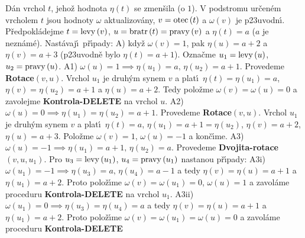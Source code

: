 \flushpar D\'an vrchol $t$, jeho\v z hodnota $\eta \left(t\right)$ se zmen\v sila (o $
1$).  V 
podstromu ur\v cen\'em vrcholem $t$ jsou hodnoty $\omega$ aktualizov\'any, 
$v=\operatorname{otec}\left(t\right)$ a $\omega \left(v\right)$ je p\accent23uvodn\'\i .  P\v redpokl\'adejme 
$t=\operatorname{levy}\left(v\right)$, $u=\operatorname{bratr}\left(t\right)=\operatorname{pravy}\left(v\right)$ a $\eta \left(t\right)=a$ ($a$ je nezn\'am\'e).  Nast\'avaj\'\i\ 
p\v r\'\i pady:\newline 
A) kdy\v z $\omega \left(v\right)=1$, pak $\eta \left(u\right)=a+2$ a $\eta \left(v\right)=a+3$ (p\accent23uvodn\v e 
bylo $\eta \left(t\right)=a+1$).  Ozna\v cme $u_1=\operatorname{levy}\left(u\right)$, $u_2=\operatorname{pravy}\left(u\right)$.\newline 
A1) $\omega \left(u\right)=1\implies\eta \left(u_1\right)=a,\,\eta \left(u_2\right)=a+1$.  Provedeme 
{\bf Rotace$\left(v,u\right)$}.  
Vrchol $u_1$ je druh\'ym synem $v$ a plat\'\i\ $\eta \left(t\right)=\eta \left(u_
1\right)=a$, 
$\eta \left(v\right)=\eta \left(u_2\right)=a+1$ a $\eta \left(u\right)=a+2$.  Tedy polo\v zme $\omega 
\left(v\right)=\omega \left(u\right)=0$ a 
zavolejme {\bf Kontrola-DELETE} na vrchol $u$.\newline 
A2) $\omega \left(u\right)=0\implies\eta \left(u_1\right)=\eta \left(u_2\right)=a+1$. Provedeme 
{\bf Rotace$\left(v,u\right)$}. Vrchol $u_1$ je druh\'ym synem $v$ a plat\'\i\ 
$\eta \left(t\right)=a$, $\eta \left(u_1\right)=a+1=\eta \left(u_2\right)$, $\eta \left(v\right)=a+2$, $\eta 
\left(u\right)=a+3$. Polo\v zme 
$\omega \left(v\right)=1$, $\omega \left(u\right)=-1$ a kon\v c\'\i me.\newline
A3) $\omega \left(u\right)=-1\implies\eta \left(u_1\right)=a+1,\,\eta \left(u_2\right)=a$.  Provedeme 
{\bf Dvojita-rotace$\left(v,u,u_1\right)$}.  Pro $u_3=\operatorname{levy}\left(u_1\right)$, 
$u_4=\operatorname{pravy}\left(u_1\right)$ nastanou p\v r\'\i pady:\newline 
A3i) $\omega \left(u_1\right)=-1\implies\eta \left(u_3\right)=a,\,\eta \left(u_4\right)=a-1$ a tedy 
$\eta \left(v\right)=\eta \left(u\right)=a+1$ a $\eta \left(u_1\right)=a+2$. Proto polo\v z\'\i me 
$\omega \left(v\right)=\omega \left(u_1\right)=0$, $\omega \left(u\right)=1$ a zavol\'ame proceduru {\bf Kontrola-DELETE }
na vrchol $u_1$.\newline 
A3ii) $\omega \left(u_1\right)=0\implies\eta \left(u_3\right)=\eta \left(u_4\right)=a$ a tedy 
$\eta \left(v\right)=\eta \left(u\right)=a+1$ a $\eta \left(u_1\right)=a+2$. Proto polo\v z\'\i me 
$\omega \left(v\right)=\omega \left(u_1\right)=\omega \left(u\right)=0$ a zavol\'ame proceduru {\bf Kontrola-DELETE }
